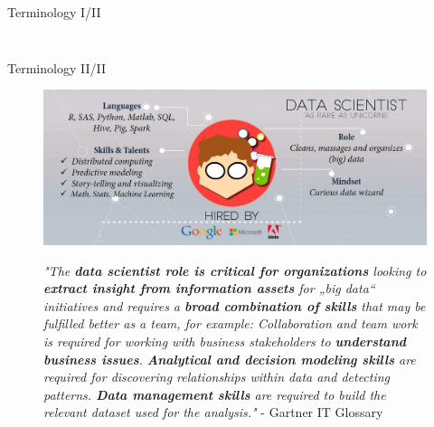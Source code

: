 \documentclass[main.tex]{subfiles}
\begin{document}
\begin{frame}{Terminology I/II}
\begin{columns}
\begin{column}{.4\textwidth}
\begin{figure}
\begin{adjustbox}{width=0.7\textheight}
                    \end{adjustbox}
                \end{figure}
            \end{column}
        \end{columns}
    \end{frame}
    
    \begin{frame}{Terminology II/II}
        \begin{figure}
            \label{fig:data-scientist}
            \includegraphics[width=.7\textwidth]{figures/external/data-scientist.png}
            
            \textit{"The \textbf{data scientist role is critical for organizations} looking to \textbf{extract insight from information assets} for „big data“ initiatives and requires a \textbf{broad combination of skills} that may be fulfilled better as a team, for example: Collaboration and team work is required for working with business stakeholders to \textbf{understand business issues}. \textbf{Analytical and decision modeling skills} are required for discovering relationships within data and detecting patterns. \textbf{Data management skills} are required to build the relevant dataset used for the analysis."} - Gartner IT Glossary
        \end{figure}
    \end{frame}
    
\end{document}
